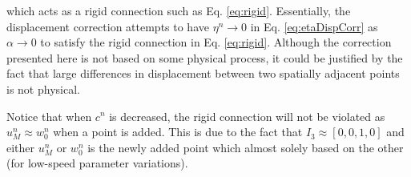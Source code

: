 which acts as a rigid connection such as Eq. \eqref{eq:rigid}. Essentially, the displacement correction attempts to have $\eta^n\rightarrow 0$ in Eq. \eqref{eq:etaDispCorr} as $\alpha \rightarrow 0$ to satisfy the rigid connection in Eq. \eqref{eq:rigid}.
Although the correction presented here is not based on some physical process, it could be justified by the fact that large differences in displacement between two spatially adjacent points is not physical. 

Notice that when $c^n$ is decreased, the rigid connection will not be violated as $u_M^n \approx w_0^n$ when a point is added. This is due to the fact that $I_3\approx [0, 0, 1, 0]$ and either $u_M^n$ or $w_0^n$ is the newly added point which almost solely based on the other (for low-speed parameter variations).
